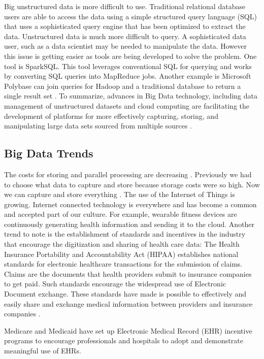 \documentclass[sigconf]{acmart}
\begin{document}
Big unstructured data is more difficult to use.  Traditional relational database users are able to access the data using a simple structured query language (SQL) that uses a sophisticated query engine that has been optimized to extract the data.  Unstructured data is much more difficult to query. A sophisticated data user, such as a data scientist may be needed to manipulate the data. However this issue is getting easier as tools are being developed to solve the problem. One tool is SparkSQL.  This tool leverages conventional SQL for querying and works by converting SQL queries into MapReduce jobs.  Another example is Microsoft Polybase can join queries for Hadoop and a traditional database to return a single result set \cite{www-google-HlthCat}. 
To summarize, advances in Big Data technology, including data management of unstructured datasets and cloud computing are facilitating the development of platforms for more effectively capturing, storing, and manipulating large data sets sourced from multiple sources \cite{springer}.  

\subsection{Big Data Trends}

The costs for storing and parallel processing are decreasing \cite{www-google-McDonald}. Previously we had to choose what data to capture and store because storage costs were so high. Now we can capture and store everything \cite{www-google-hadoop}.
The use of the Internet of Things is growing. Internet connected technology is everywhere and has become a common and accepted part of our culture.  For example, wearable fitness devices are continuously generating health information and sending it to the cloud. 
Another trend to note is the establishment of standards and incentives in the industry that encourage the digitization and sharing of health care data: 
The Health Insurance Portability and Accountability Act (HIPAA) establishes national standards for electronic healthcare transactions for the submission of claims. Claims are the documents that health providers submit to insurance companies to get paid. Such standards encourage the widespread use of Electronic Document exchange. These standards have made is possible to effectively and easily share and exchange medical information between providers and insurance companies \cite{www-google-McDonald}.

Medicare and Medicaid have set up Electronic Medical Record (EHR) incentive programs to encourage professionals and hospitals to adopt and demonstrate meaningful use of EHRs.
\end{document}
